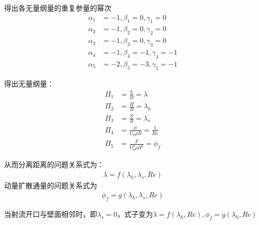 得出各无量纲量的重复参量的幂次
\begin{align*}
    \alpha_{1}&=-1,\beta_{1}=0,\gamma_{1}=0\\
    \alpha_{2}&=-1,\beta_{2}=0,\gamma_{2}=0\\
    \alpha_{3}&=-1,\beta_{3}=0,\gamma_{3}=0\\
    \alpha_{4}&=-1,\beta_{4}=-1,\gamma_{4}=-1\\
    \alpha_{5}&=-2,\beta_{5}=-3,\gamma_{5}=-1
\end{align*}

得出无量纲量：
\begin{align}
    \Pi_{1}&=\frac{h}{B}=\lambda\\
    \Pi_{2}&=\frac{H}{B}=\lambda_{h}\\
    \Pi_{3}&=\frac{S}{B}=\lambda_{s}\\
    \Pi_{4}&=\frac{\mu }{U_{0}\rho B}=\frac{1}{Re}\\
    \Pi_{5}&=\frac{F }{U_{0}^{3}\rho B^{2}}=\phi_{f}
\end{align}

从而分离距离的问题关系式为：
\begin{align}
    \lambda=f(\lambda_{h},\lambda_{s},Re)
\end{align}
动量扩散通量的问题关系式为
\begin{align}
    \phi_{f}=g(\lambda_{h},\lambda_{s},Re)
\end{align}

当射流开口与壁面相邻时，即$\lambda_{s}=0$，式子变为$\lambda=f(\lambda_{h},Re),\phi_{f}=g(\lambda_{h},Re)$
